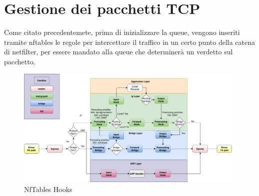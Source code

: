 \section{Gestione dei pacchetti TCP}

Come citato precedentemete, prima di inizializzare la queue, vengono inseriti tramite nftables le regole per intercettare il traffico in un certo punto della catena
di netfilter, per essere mandato alla queue che determinerà un verdetto sul pacchetto.\\

\begin{figure}[H]
    \centering
    \includegraphics[width=0.98\textwidth]{images/chapter3/nf-hooks.png}
    \caption{NfTables Hooks}\label{fig:nftables_hooks}
\end{figure}


